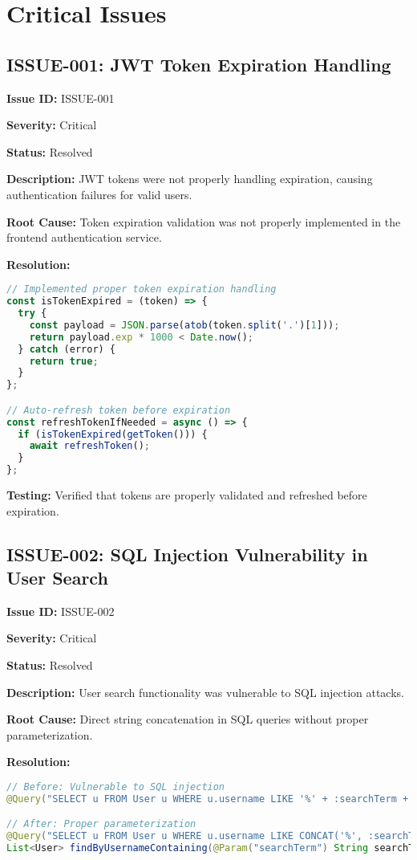 \documentclass[12pt,a4paper]{article}
\begin{document}
\section{Critical Issues}

\subsection{ISSUE-001: JWT Token Expiration Handling}

\textbf{Issue ID:} ISSUE-001

\textbf{Severity:} Critical

\textbf{Status:} Resolved

\textbf{Description:} JWT tokens were not properly handling expiration, causing authentication failures for valid users.

\textbf{Root Cause:} Token expiration validation was not properly implemented in the frontend authentication service.

\textbf{Resolution:}
\begin{lstlisting}[language=JavaScript, caption=Token Expiration Fix]
// Implemented proper token expiration handling
const isTokenExpired = (token) => {
  try {
    const payload = JSON.parse(atob(token.split('.')[1]));
    return payload.exp * 1000 < Date.now();
  } catch (error) {
    return true;
  }
};

// Auto-refresh token before expiration
const refreshTokenIfNeeded = async () => {
  if (isTokenExpired(getToken())) {
    await refreshToken();
  }
};
\end{lstlisting}

\textbf{Testing:} Verified that tokens are properly validated and refreshed before expiration.

\subsection{ISSUE-002: SQL Injection Vulnerability in User Search}

\textbf{Issue ID:} ISSUE-002

\textbf{Severity:} Critical

\textbf{Status:} Resolved

\textbf{Description:} User search functionality was vulnerable to SQL injection attacks.

\textbf{Root Cause:} Direct string concatenation in SQL queries without proper parameterization.

\textbf{Resolution:}
\begin{lstlisting}[language=Java, caption=SQL Injection Fix]
// Before: Vulnerable to SQL injection
@Query("SELECT u FROM User u WHERE u.username LIKE '%' + :searchTerm + '%'")

// After: Proper parameterization
@Query("SELECT u FROM User u WHERE u.username LIKE CONCAT('%', :searchTerm, '%')")
List<User> findByUsernameContaining(@Param("searchTerm") String searchTerm);
\end{lstlisting}
\end{document}

